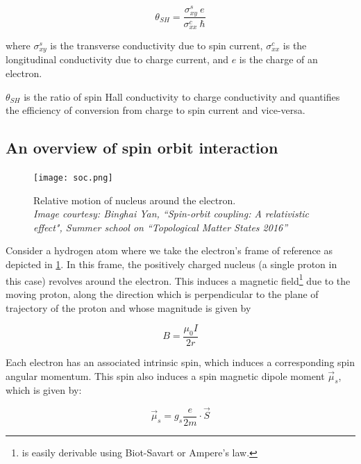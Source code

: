 \begin{equation} \label{eq:sha}
    \theta_{SH} = \frac{\sigma^s_{xy} \: e}{\sigma^c_{xx} \: \hbar}
\end{equation}

where \( \sigma^s_{xy} \) is the transverse conductivity due to spin current, \( \sigma^c_{xx} \) is the longitudinal conductivity due to charge current, and \( e \) is the charge of an electron.

\( \theta_{SH} \) is the ratio of spin Hall conductivity to charge conductivity and quantifies the efficiency of conversion from charge to spin current and vice-versa.

\subsection{An overview of spin orbit interaction}

\begin{figure}[h!]
    \centering
    \texttt{[image: soc.png]}
    \caption{Relative motion of nucleus around the electron.\\ \vspace{0.2cm} \textit{Image courtesy: Binghai Yan, ``Spin-orbit coupling: A relativistic effect", Summer school on ``Topological Matter States 2016''}}
    \label{fig:soc-atom}
\end{figure}

Consider a hydrogen atom where we take the electron's frame of reference as depicted in \cref{fig:soc-atom}.
In this frame, the positively charged nucleus (a single proton in this case) revolves around the electron.
This induces a magnetic field\footnote{ is easily derivable using Biot-Savart or Ampere's law.} due to the moving proton, along the direction which is perpendicular to the plane of trajectory of the proton and whose magnitude is given by

\begin{equation} \label{eq:B-field-ring}
    B = \frac{\mu_0 I}{2r}
\end{equation}

Each electron has an associated intrinsic spin, which induces a corresponding spin angular momentum.
This spin also induces a spin magnetic dipole moment \( \vec{\mu}_s \), which is given by:

\begin{equation} \label{eq:mu_sS}
    \vec{\mu}_s = g_s \frac{e}{2m} \cdot \vec{S}
\end{equation}

